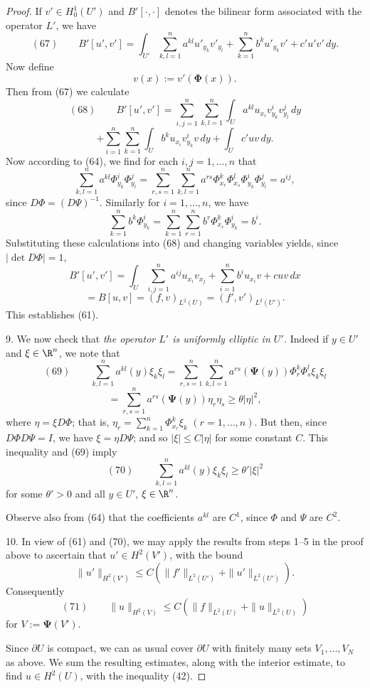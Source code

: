 \begin{proof}
If $v' \in H_0^1(U')$ and $B'[\cdot,\cdot]$ denotes the bilinear form associated with the operator $L'$, we have
$$(67) \qquad B'[u',v'] = \int_{U'} \sum_{k,l=1}^n a^{kl}u'_{y_k}v'_{y_l} + \sum_{k=1}^n b^ku'_{y_k}v' + c'u'v'\,dy.$$
Now define
$$v(x) := v'(\boldsymbol\Phi(x)).$$
Then from (67) we calculate
$$(68) \qquad B'[u',v'] = \sum_{i,j=1}^n \sum_{k,l=1}^n \int_U a^{kl}u_{x_i}v_{y_k}^i v_{y_l}^j\,dy$$
$$+ \sum_{i=1}^n \sum_{k=1}^n \int_U b^k u_{x_i}v_{y_k}^i v\,dy + \int_U c'uv\,dy.$$
Now according to (64), we find for each $i,j = 1,\ldots,n$ that
$$\sum_{k,l=1}^n a^{kl}\Phi^i_{y_k}\Phi^j_{y_l} = \sum_{r,s=1}^n \sum_{k,l=1}^n a^{rs}\Phi^k_{x_r}\Phi^l_{x_s}\Phi^i_{y_k}\Phi^j_{y_l} = a^{ij},$$
since $D\Phi = (D\Psi)^{-1}$. Similarly for $i = 1,\ldots,n$, we have
$$\sum_{k=1}^n b^k\Phi^i_{y_k} = \sum_{k=1}^n \sum_{r=1}^n b^r\Phi^k_{x_r}\Phi^i_{y_k} = b^i.$$
Substituting these calculations into (68) and changing variables yields, since $|\det D\Phi| = 1$,
$$B'[u',v'] = \int_U \sum_{i,j=1}^n a^{ij}u_{x_i}v_{x_j} + \sum_{i=1}^n b^iu_{x_i}v + cuv\,dx$$
$$= B[u,v] = (f,v)_{L^2(U)} = (f',v')_{L^2(U')}.$$
This establishes (61).

9. We now check that \textit{the operator $L'$ is uniformly elliptic in $U'$.} Indeed if $y \in U'$ and $\xi \in \R^n$, we note that
$$(69) \qquad \sum_{k,l=1}^n a^{kl}(y)\xi_k\xi_l = \sum_{r,s=1}^n \sum_{k,l=1}^n a^{rs}(\boldsymbol\Psi(y))\Phi^k_r\Phi^l_s\xi_k\xi_l$$
$$= \sum_{r,s=1}^n a^{rs}(\boldsymbol\Psi(y))\eta_r\eta_s \geq \theta|\eta|^2,$$
where $\eta = \xi D\Phi$; that is, $\eta_r = \sum_{k=1}^n \Phi^k_{x_r}\xi_k$ $(r=1,\ldots,n)$. But then, since $D\Phi D\Psi = I$, we have $\xi = \eta D\Psi$; and so $|\xi| \leq C|\eta|$ for some constant $C$. This inequality and (69) imply
$$(70) \qquad \sum_{k,l=1}^n a^{kl}(y)\xi_k\xi_l \geq \theta'|\xi|^2$$
for some $\theta' > 0$ and all $y \in U'$, $\xi \in \R^n$.

Observe also from (64) that the coefficients $a^{kl}$ are $C^1$, since $\Phi$ and $\Psi$ are $C^2$.

10. In view of (61) and (70), we may apply the results from steps 1--5 in the proof above to ascertain that $u' \in H^2(V')$, with the bound
$$\|u'\|_{H^2(V')} \leq C(\|f'\|_{L^2(U')} + \|u'\|_{L^2(U')}).$$
Consequently
$$(71) \qquad \|u\|_{H^2(V)} \leq C(\|f\|_{L^2(U)} + \|u\|_{L^2(U)})$$
for $V := \boldsymbol\Psi(V')$.

Since $\partial U$ is compact, we can as usual cover $\partial U$ with finitely many sets $V_1,\ldots,V_N$ as above. We sum the resulting estimates, along with the interior estimate, to find $u \in H^2(U)$, with the inequality (42).
\end{proof}

